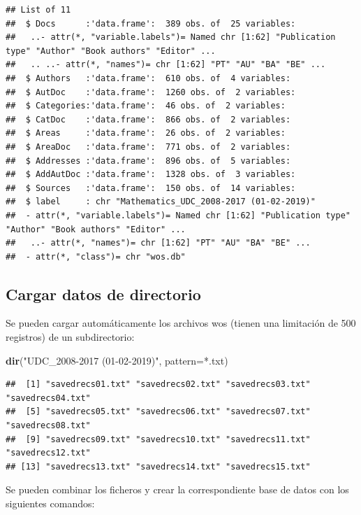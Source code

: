\documentclass[
]{book}
\newenvironment{Shaded}{\begin{snugshade}}{\end{snugshade}}
\newcommand{\AttributeTok}[1]{\textcolor[rgb]{0.13,0.29,0.53}{#1}}
\newcommand{\FunctionTok}[1]{\textcolor[rgb]{0.13,0.29,0.53}{\textbf{#1}}}
\newcommand{\NormalTok}[1]{#1}
\newcommand{\StringTok}[1]{\textcolor[rgb]{0.31,0.60,0.02}{#1}}
\begin{document}
\begin{verbatim}
## List of 11
##  $ Docs      :'data.frame':  389 obs. of  25 variables:
##   ..- attr(*, "variable.labels")= Named chr [1:62] "Publication type" "Author" "Book authors" "Editor" ...
##   .. ..- attr(*, "names")= chr [1:62] "PT" "AU" "BA" "BE" ...
##  $ Authors   :'data.frame':  610 obs. of  4 variables:
##  $ AutDoc    :'data.frame':  1260 obs. of  2 variables:
##  $ Categories:'data.frame':  46 obs. of  2 variables:
##  $ CatDoc    :'data.frame':  866 obs. of  2 variables:
##  $ Areas     :'data.frame':  26 obs. of  2 variables:
##  $ AreaDoc   :'data.frame':  771 obs. of  2 variables:
##  $ Addresses :'data.frame':  896 obs. of  5 variables:
##  $ AddAutDoc :'data.frame':  1328 obs. of  3 variables:
##  $ Sources   :'data.frame':  150 obs. of  14 variables:
##  $ label     : chr "Mathematics_UDC_2008-2017 (01-02-2019)"
##  - attr(*, "variable.labels")= Named chr [1:62] "Publication type" "Author" "Book authors" "Editor" ...
##   ..- attr(*, "names")= chr [1:62] "PT" "AU" "BA" "BE" ...
##  - attr(*, "class")= chr "wos.db"
\end{verbatim}

\hypertarget{cargar-datos-de-directorio}{%
\subsection{Cargar datos de directorio}\label{cargar-datos-de-directorio}}

Se pueden cargar automáticamente los archivos wos
(tienen una limitación de 500 registros) de un subdirectorio:

\begin{Shaded}
\begin{Highlighting}[]
\FunctionTok{dir}\NormalTok{(}\StringTok{"UDC\_2008{-}2017 (01{-}02{-}2019)"}\NormalTok{, }\AttributeTok{pattern=}\StringTok{\textquotesingle{}*.txt\textquotesingle{}}\NormalTok{)}
\end{Highlighting}
\end{Shaded}

\begin{verbatim}
##  [1] "savedrecs01.txt" "savedrecs02.txt" "savedrecs03.txt" "savedrecs04.txt"
##  [5] "savedrecs05.txt" "savedrecs06.txt" "savedrecs07.txt" "savedrecs08.txt"
##  [9] "savedrecs09.txt" "savedrecs10.txt" "savedrecs11.txt" "savedrecs12.txt"
## [13] "savedrecs13.txt" "savedrecs14.txt" "savedrecs15.txt"
\end{verbatim}

Se pueden combinar los ficheros y crear la correspondiente base de datos con los siguientes comandos:
\end{document}
